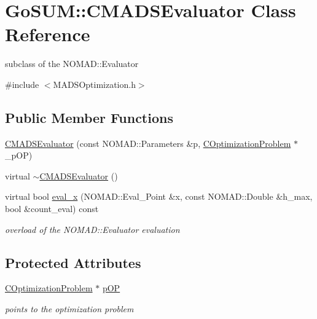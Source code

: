 \hypertarget{class_go_s_u_m_1_1_c_m_a_d_s_evaluator}{\section{Go\-S\-U\-M\-:\-:C\-M\-A\-D\-S\-Evaluator Class Reference}
\label{class_go_s_u_m_1_1_c_m_a_d_s_evaluator}
}


subclass of the N\-O\-M\-A\-D\-::\-Evaluator  




{\ttfamily \#include $<$M\-A\-D\-S\-Optimization.\-h$>$}

\subsection*{Public Member Functions}
\begin{DoxyCompactItemize}
\item 
\hyperlink{class_go_s_u_m_1_1_c_m_a_d_s_evaluator_a93bbf8d4a7cba8c42d78e693d740ecca}{C\-M\-A\-D\-S\-Evaluator} (const N\-O\-M\-A\-D\-::\-Parameters \&p, \hyperlink{class_go_s_u_m_1_1_c_optimization_problem}{C\-Optimization\-Problem} $\ast$\-\_\-p\-O\-P)
\item 
virtual \hyperlink{class_go_s_u_m_1_1_c_m_a_d_s_evaluator_a2c2f16f4ebf1b905c03a4b206327525e}{$\sim$\-C\-M\-A\-D\-S\-Evaluator} ()
\item 
virtual bool \hyperlink{class_go_s_u_m_1_1_c_m_a_d_s_evaluator_a8ec7a40fbcedbffa274ab71152c6fdbe}{eval\-\_\-x} (N\-O\-M\-A\-D\-::\-Eval\-\_\-\-Point \&x, const N\-O\-M\-A\-D\-::\-Double \&h\-\_\-max, bool \&count\-\_\-eval) const 
\begin{DoxyCompactList}\small\item\em overload of the N\-O\-M\-A\-D\-::\-Evaluator evaluation \end{DoxyCompactList}\end{DoxyCompactItemize}
\subsection*{Protected Attributes}
\begin{DoxyCompactItemize}
\item 
\hyperlink{class_go_s_u_m_1_1_c_optimization_problem}{C\-Optimization\-Problem} $\ast$ \hyperlink{class_go_s_u_m_1_1_c_m_a_d_s_evaluator_ab77f553e50ddfe33ca57c1056f78e226}{p\-O\-P}
\begin{DoxyCompactList}\small\item\em points to the optimization problem \end{DoxyCompactList}\end{DoxyCompactItemize}


